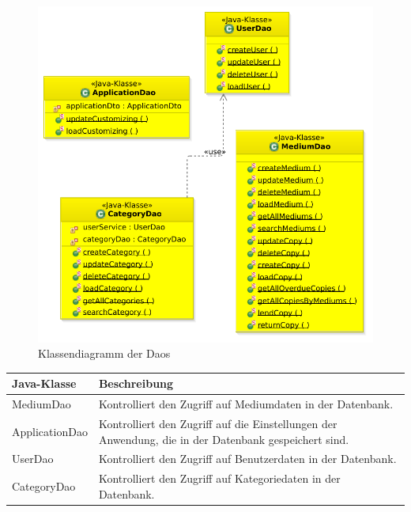 \documentclass{article}
\begin{document}
\begin{center}
    \begin{figure}[H]
        \includegraphics[scale=0.6]{KlassendiagrammDaos.pdf}
        \caption{Klassendiagramm der Daos  }
        \label{fig:Managedbeans Klassendiagramm}
    \end{figure}
\end{center}

\begin{center}
    \begin{table}
        \begin{tabular} { |p{}|p{}| }
            \hline
            Java-Klasse & Beschreibung \\
            \hline\hline
            MediumDao & Kontrolliert den Zugriff auf Mediumdaten in der Datenbank. \\
            \hline
            ApplicationDao & Kontrolliert den Zugriff auf die Einstellungen der Anwendung, die in der Datenbank gespeichert sind. \\
            \hline
            UserDao & Kontrolliert den Zugriff auf Benutzerdaten in der Datenbank. \\
            \hline
            CategoryDao & Kontrolliert den Zugriff auf Kategoriedaten in der Datenbank. \\
            \hline
        \end{tabular}
    \end{table}
\end{center}
\end{document}
